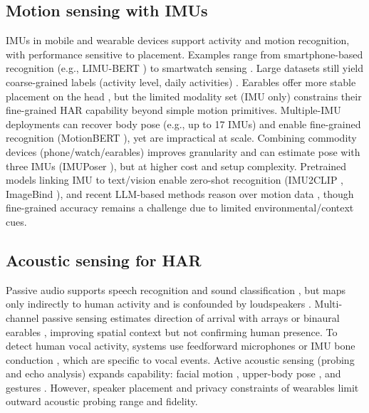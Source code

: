 \subsection{Motion sensing with IMUs}
IMUs in mobile and wearable devices support activity and motion recognition, with performance sensitive to placement. Examples range from smartphone-based recognition (e.g., LIMU-BERT \cite{xu2021limu}) to smartwatch sensing \cite{chan2024capture}. Large datasets still yield coarse-grained labels (activity level, daily activities) \cite{chan2024capture}. Earables offer more stable placement on the head \cite{lyu2024earda, han2023headmon, han2023headsense, han2025headmon+}, but the limited modality set (IMU only) constrains their fine-grained HAR capability beyond simple motion primitives.
Multiple-IMU deployments can recover body pose (e.g., up to 17 IMUs) and enable fine-grained recognition (MotionBERT \cite{zhu2023motionbert}), yet are impractical at scale. Combining commodity devices (phone/watch/earables) improves granularity \cite{stromback2020mm} and can estimate pose with three IMUs (IMUPoser \cite{mollyn2023imuposer}), but at higher cost and setup complexity. Pretrained models linking IMU to text/vision enable zero-shot recognition (IMU2CLIP \cite{moon2023imu2clip}, ImageBind \cite{girdhar2023imagebind}), and recent LLM-based methods reason over motion data \cite{ji2024hargpt, leng2024imugpt, xu2024autolife, ouyang2024llmsense, xu2024penetrative}, though fine-grained accuracy remains a challenge due to limited environmental/context cues.

\subsection{Acoustic sensing for HAR}
Passive audio supports speech recognition and sound classification \cite{schmid2023efficient}, but maps only indirectly to human activity and is confounded by loudspeakers \cite{cristina2024audio}. Multi-channel passive sensing estimates direction of arrival with arrays \cite{schmidt1986multiple, adavanne2018sound} or binaural earables \cite{yang2022deepear, krause2021joint}, improving spatial context but not confirming human presence. To detect human vocal activity, systems use feedforward microphones \cite{zhang2024earsavas} or IMU bone conduction \cite{he2023towards}, which are specific to vocal events. Active acoustic sensing (probing and echo analysis) expands capability: facial motion \cite{dong2024rehearsse}, upper-body pose \cite{mahmud2023posesonic}, and gestures \cite{yang2024maf}. However, speaker placement and privacy constraints of wearables limit outward acoustic probing range and fidelity.

